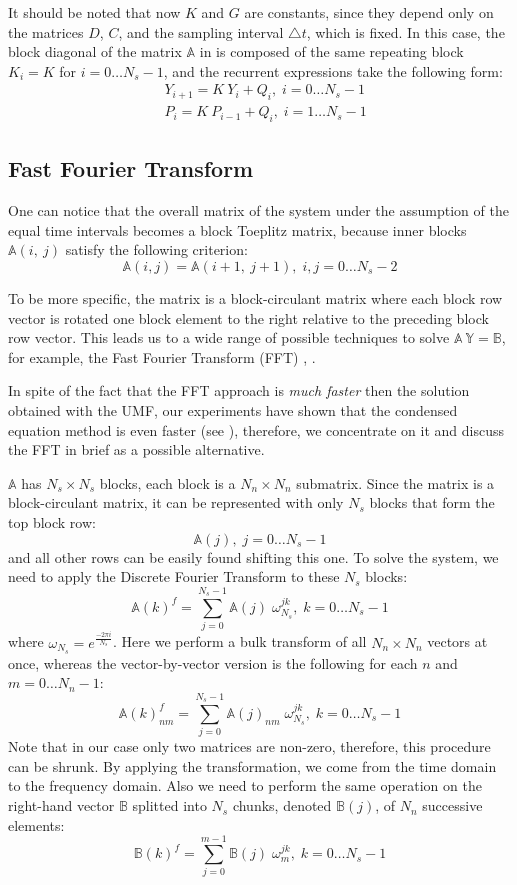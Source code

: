 It should be noted that now $K$ and $G$ are constants, since they depend only on the matrices $D$, $C$, and the sampling interval $\triangle t$, which is fixed. In this case, the block diagonal of the matrix $\mathbb{A}$ in  is composed of the same repeating block $K_i = K$ for $i = 0 \dots N_s - 1$, and the recurrent expressions take the following form:
\begin{align}
  & Y_{i + 1} = K \: Y_i + Q_i, \; i = 0 \dots N_s - 1 \nonumber \\
  & P_i = K \: P_{i - 1} + Q_i, \; i = 1 \dots N_s - 1 \nonumber
\end{align}

\subsection{Fast Fourier Transform}
One can notice that the overall matrix of the system under the assumption of the equal time intervals becomes a block Toeplitz matrix, because inner blocks $\mathbb{A}(i, \: j)$ satisfy the following criterion:
\[
  \mathbb{A}(i, j) = \mathbb{A}(i+1, \: j+1), \; i, j = 0 \dots N_s - 2
\]

To be more specific, the matrix is a block-circulant matrix where each block row vector is rotated one block element to the right relative to the preceding block row vector. This leads us to a wide range of possible techniques to solve \mbox{$\mathbb{A} \: \mathbb{Y} = \mathbb{B}$}, for example, the Fast Fourier Transform (FFT) \cite{mazancourt1983}, \cite{vescovo1997}.

In spite of the fact that the FFT approach is \emph{much faster} then the solution obtained with the UMF, our experiments have shown that the condensed equation method is even faster (see ), therefore, we concentrate on it and discuss the FFT in brief as a possible alternative.

$\mathbb{A}$ has $N_s \times N_s$ blocks, each block is a $N_n \times N_n$ submatrix. Since the matrix is a block-circulant matrix, it can be represented with only $N_s$ blocks that form the top block row:
\[
  \mathbb{A}(j), \; j = 0 \dots N_s - 1
\]
and all other rows can be easily found shifting this one. To solve the system, we need to apply the Discrete Fourier Transform to these $N_s$ blocks:
\[
  \mathbb{A}(k)^f = \sum_{j = 0}^{N_s - 1} \mathbb{A}(j) \; \omega_{N_s}^{jk}, \; k = 0 \dots N_s - 1
\]
where $\omega_{N_s} = e^{\frac{-2 \pi i}{N_s}}$. Here we perform a bulk transform of all $N_n \times N_n$ vectors at once, whereas the vector-by-vector version is the following for each $n$ and $m = 0 \dots N_n - 1$:
\[
  \mathbb{A}(k)^f_{nm} = \sum_{j = 0}^{N_s - 1} \mathbb{A}(j)_{nm} \; \omega_{N_s}^{jk}, \; k = 0 \dots N_s - 1
\]
Note that in our case only two matrices are non-zero, therefore, this procedure can be shrunk. By applying the transformation, we come from the time domain to the frequency domain. Also we need to perform the same operation on the right-hand vector $\mathbb{B}$ splitted into $N_s$ chunks, denoted $\mathbb{B}(j)$, of $N_n$ successive elements:
\[
  \mathbb{B}(k)^f = \sum_{j = 0}^{m - 1} \mathbb{B}(j) \; \omega_m^{jk}, \; k = 0 \dots N_s - 1
\]

